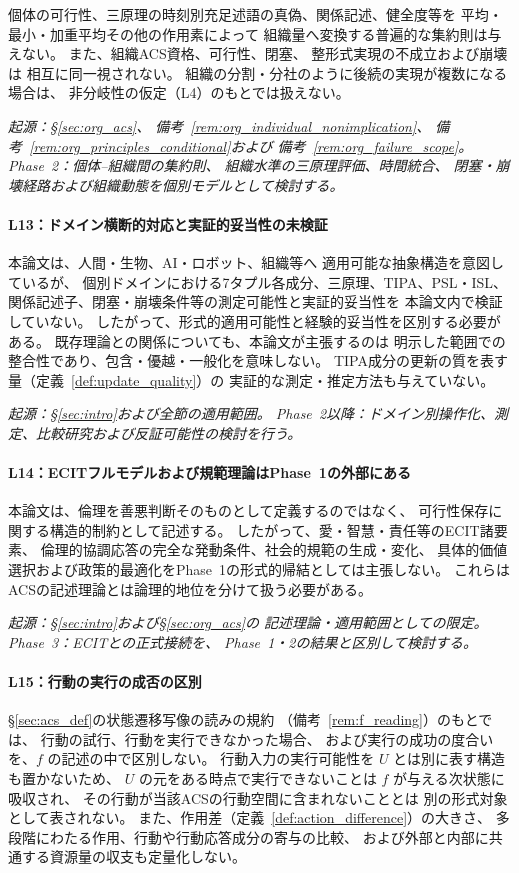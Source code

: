 個体の可行性、三原理の時刻別充足述語の真偽、関係記述、健全度等を
平均・最小・加重平均その他の作用素によって
組織量へ変換する普遍的な集約則は与えない。
また、組織ACS資格、可行性、閉塞、
整形式実現の不成立および崩壊は
相互に同一視されない。
組織の分割・分社のように後続の実現が複数になる場合は、
非分岐性の仮定（L4）のもとでは扱えない。

\medskip
\noindent\textit{起源：\S\ref{sec:org_acs}、
備考~\ref{rem:org_individual_nonimplication}、
備考~\ref{rem:org_principles_conditional}および
備考~\ref{rem:org_failure_scope}。
Phase~2：個体--組織間の集約則、
組織水準の三原理評価、時間統合、
閉塞・崩壊経路および組織動態を個別モデルとして検討する。}

\paragraph{L13：ドメイン横断的対応と実証的妥当性の未検証}
\label{lim:L13}
本論文は、人間・生物、AI・ロボット、組織等へ
適用可能な抽象構造を意図しているが、
個別ドメインにおける7タプル各成分、三原理、TIPA、PSL・ISL、
関係記述子、閉塞・崩壊条件等の測定可能性と実証的妥当性を
本論文内で検証していない。
したがって、形式的適用可能性と経験的妥当性を区別する必要がある。
既存理論との関係についても、本論文が主張するのは
明示した範囲での整合性であり、包含・優越・一般化を意味しない。
TIPA成分の更新の質を表す量（定義~\ref{def:update_quality}）の
実証的な測定・推定方法も与えていない。

\medskip
\noindent\textit{起源：\S\ref{sec:intro}および全節の適用範囲。
Phase~2以降：ドメイン別操作化、測定、比較研究および反証可能性の検討を行う。}

\paragraph{L14：ECITフルモデルおよび規範理論はPhase~1の外部にある}
\label{lim:L14}
本論文は、倫理を善悪判断そのものとして定義するのではなく、
可行性保存に関する構造的制約として記述する。
したがって、愛・智慧・責任等のECIT諸要素、
倫理的協調応答の完全な発動条件、社会的規範の生成・変化、
具体的価値選択および政策的最適化をPhase~1の形式的帰結としては主張しない。
これらはACSの記述理論とは論理的地位を分けて扱う必要がある。

\medskip
\noindent\textit{起源：\S\ref{sec:intro}および\S\ref{sec:org_acs}の
記述理論・適用範囲としての限定。
Phase~3：ECITとの正式接続を、
Phase~1・2の結果と区別して検討する。}

\paragraph{L15：行動の実行の成否の区別}
\label{lim:L15}
\S\ref{sec:acs_def}の状態遷移写像の読みの規約
（備考~\ref{rem:f_reading}）のもとでは、
行動の試行、行動を実行できなかった場合、
および実行の成功の度合いを、$f$ の記述の中で区別しない。
行動入力の実行可能性を $U$ とは別に表す構造も置かないため、
$U$ の元をある時点で実行できないことは
$f$ が与える次状態に吸収され、
その行動が当該ACSの行動空間に含まれないこととは
別の形式対象として表されない。
また、作用差（定義~\ref{def:action_difference}）の大きさ、
多段階にわたる作用、行動や行動応答成分の寄与の比較、
および外部と内部に共通する資源量の収支も定量化しない。


